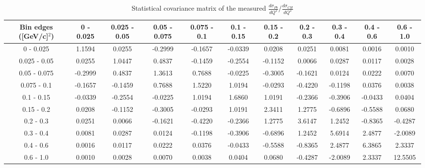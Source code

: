 \documentclass[aps,prl,twocolumn,superscriptaddress,nofootinbib]{revtex4-1}
\begin{document}
\begin{turnpage}
 \begin{table}[h!]
  \centering
  \caption{Statistical covariance matrix of the measured $\frac{d\sigma_{Pb}}{dQ^{2}}/\frac{d\sigma_{CH}}{dQ^{2}}$}
    \begin{tabular}{c||cccccccccc}
      Bin edges ([GeV/c]$^{2}$) & 0 - 0.025 & 0.025 - 0.05 & 0.05 - 0.075 & 0.075 - 0.1 & 0.1 - 0.15 & 0.15 - 0.2 & 0.2 - 0.3 & 0.3 - 0.4 & 0.4 - 0.6 & 0.6 - 1.0 \\
\hline \hline
         0 - 0.025 &  1.1594 &  0.0255 & -0.2999 & -0.1657 & -0.0339 &  0.0208 &  0.0251 &  0.0081 &  0.0016 &  0.0010 \\
      0.025 - 0.05 &  0.0255 &  1.0447 &  0.4837 & -0.1459 & -0.2554 & -0.1152 &  0.0066 &  0.0287 &  0.0117 &  0.0028 \\
      0.05 - 0.075 & -0.2999 &  0.4837 &  1.3613 &  0.7688 & -0.0225 & -0.3005 & -0.1621 &  0.0124 &  0.0222 &  0.0070 \\
       0.075 - 0.1 & -0.1657 & -0.1459 &  0.7688 &  1.5220 &  1.0194 & -0.0293 & -0.4220 & -0.1198 &  0.0376 &  0.0038 \\
        0.1 - 0.15 & -0.0339 & -0.2554 & -0.0225 &  1.0194 &  1.6860 &  1.0191 & -0.2366 & -0.3906 & -0.0433 &  0.0404 \\
        0.15 - 0.2 &  0.0208 & -0.1152 & -0.3005 & -0.0293 &  1.0191 &  2.3411 &  1.2775 & -0.6896 & -0.5588 &  0.0680 \\
         0.2 - 0.3 &  0.0251 &  0.0066 & -0.1621 & -0.4220 & -0.2366 &  1.2775 &  3.6147 &  1.2452 & -0.8365 & -0.4287 \\
         0.3 - 0.4 &  0.0081 &  0.0287 &  0.0124 & -0.1198 & -0.3906 & -0.6896 &  1.2452 &  5.6914 &  2.4877 & -2.0089 \\
         0.4 - 0.6 &  0.0016 &  0.0117 &  0.0222 &  0.0376 & -0.0433 & -0.5588 & -0.8365 &  2.4877 &  6.3865 &  2.3337 \\
         0.6 - 1.0 &  0.0010 &  0.0028 &  0.0070 &  0.0038 &  0.0404 &  0.0680 & -0.4287 & -2.0089 &  2.3337 & 12.5505 \\
    \end{tabular}
  \label{tablecov:Pb_Statistical_Q2}
 \end{table}
\end{turnpage}
\end{document}
